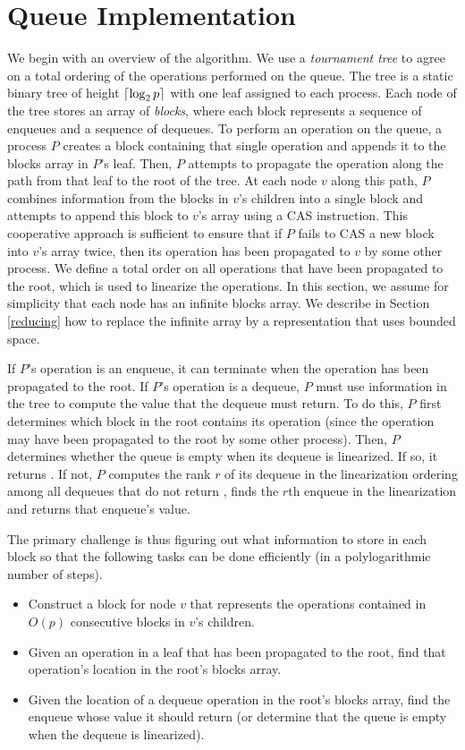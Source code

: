 
\section{Queue Implementation} \label{DescriptQ}

We begin with an overview of the algorithm.
We use a \emph{tournament tree} to agree on a total ordering of the operations performed on the queue.
The tree is a static binary tree of height $\lceil \log_2 p \rceil$ with one leaf 
assigned to each process. 
Each node of the tree stores an array of \emph{blocks}, where each block represents a 
sequence of enqueues and a sequence of dequeues.
To perform an operation on the queue, a process $P$ creates a block containing that single 
operation and appends it to the blocks array in $P$'s leaf.
Then, $P$ attempts to propagate the operation along the path from that leaf to the root of the tree.
At each node $v$ along this path, $P$ combines information from the blocks in $v$'s children into a single
block and attempts to append this block to $v$'s array using a CAS instruction.
This cooperative approach is sufficient to ensure that if $P$ fails to CAS a new block into $v$'s array twice,
then its operation has been propagated to $v$ by some other process.
We define a total order on all operations that have been propagated to the root, which is used to
linearize the operations.
In this section, we assume for simplicity that each node has an infinite blocks array.
We describe in Section \ref{reducing} how to replace the infinite array by a representation that uses bounded space.

If $P$'s operation is an enqueue, it can terminate when the operation has been propagated to the root.
If $P$'s operation is a dequeue, $P$ must use information in the tree to compute the value that the
dequeue must return.  To do this, $P$ first determines which block in the root contains its operation
(since the operation may have been propagated to the root by some other process).
Then, $P$ determines whether the queue is empty when its dequeue is linearized. If so, it returns \nil.
If not, $P$ computes the rank $r$ of its dequeue in the linearization ordering
among all dequeues that do not return \nil,
finds the $r$th enqueue in the linearization and returns that enqueue's value.

The primary challenge is thus figuring out what information to store in each block so that 
the following tasks can be done efficiently (in a polylogarithmic number of steps).
\begin{itemize}
\item
Construct a block for node $v$ that represents the operations contained in $O(p)$ consecutive blocks in $v$'s children.
\item
Given an operation in a leaf that has been propagated to the root, find that operation's location in the root's blocks array.
\item
Given the location of a dequeue operation in the root's blocks array, find the enqueue whose value it should return (or determine that the queue is empty when the dequeue is linearized).
\end{itemize}

